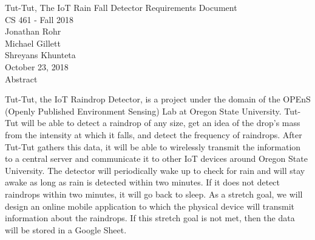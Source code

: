 \documentclass[letterpaper,10pt,draftclsnofoot,onecolumn]{article}
\begin{document}
\begin{titlepage}
\vspace*{\fill}
\begin{center}
{\Large Tut-Tut, The IoT Rain Fall Detector Requirements Document}
\\[0.3cm]

{\large CS 461 - Fall 2018}
\\[0.3cm]

{\large Jonathan Rohr}
\\[0.3cm]

{\large Michael Gillett}
\\[0.3cm]

{\large Shreyans Khunteta}
\\[0.3cm]

{\large October 23, 2018}
\\[1cm]

{\Large Abstract}
\end{center}
Tut-Tut, the IoT Raindrop Detector, is a project under the domain of the OPEnS (Openly Published Environment Sensing) Lab at Oregon State University. Tut-Tut will be able to detect a raindrop of any size, get an idea of the drop's mass from the intensity at which it falls, and detect the frequency of raindrops. After Tut-Tut gathers this data, it will be able to wirelessly transmit the information to a central server and communicate it to other IoT devices around Oregon State University. The detector will periodically wake up to check for rain and will stay awake as long as rain is detected within two minutes. If it does not detect raindrops within two minutes, it will go back to sleep. As a stretch goal, we will design an online mobile application to which the physical device will transmit information about the raindrops. If this stretch goal is not met, then the data will be stored in a Google Sheet.
\vspace*{\fill}
\end{titlepage}
\end{document}
